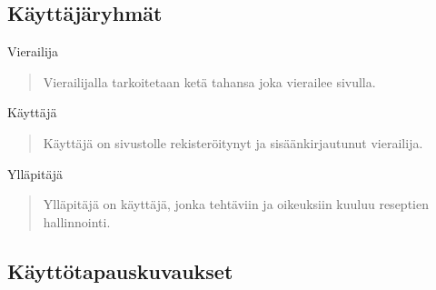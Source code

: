 \documentclass[a4paper]{article}
\begin{document}
\subsection{Käyttäjäryhmät}
Vierailija
\begin{quote}
  Vierailijalla tarkoitetaan ketä tahansa joka vierailee sivulla.
\end{quote}
Käyttäjä
\begin{quote}
  Käyttäjä on sivustolle rekisteröitynyt ja sisäänkirjautunut vierailija.
\end{quote}
Ylläpitäjä
\begin{quote}
  Ylläpitäjä on käyttäjä, jonka tehtäviin ja oikeuksiin kuuluu reseptien hallinnointi.
\end{quote}

\subsection{Käyttötapauskuvaukset}
\end{document}
